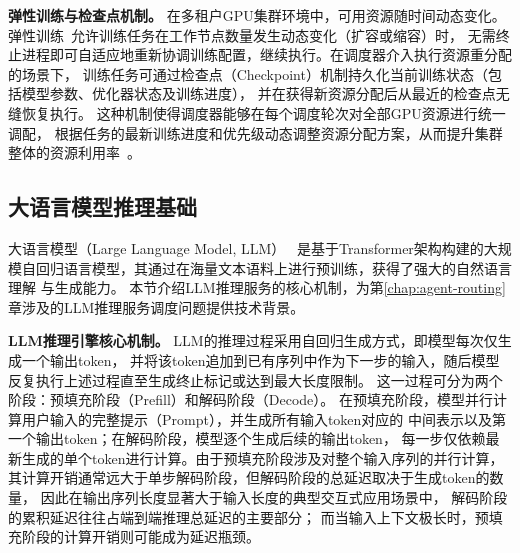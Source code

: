 \textbf{弹性训练与检查点机制。}
在多租户GPU集群环境中，可用资源随时间动态变化。弹性训练~\cite{li2020pytorch}允许训练任务在工作节点数量发生动态变化（扩容或缩容）时，
无需终止进程即可自适应地重新协调训练配置，继续执行。在调度器介入执行资源重分配的场景下，
训练任务可通过检查点（Checkpoint）机制持久化当前训练状态（包括模型参数、优化器状态及训练进度），
并在获得新资源分配后从最近的检查点无缝恢复执行。
这种机制使得调度器能够在每个调度轮次对全部GPU资源进行统一调配，
根据任务的最新训练进度和优先级动态调整资源分配方案，从而提升集群整体的资源利用率~\cite{peng2018optimus,qiao2021pollux}。


\subsection{大语言模型推理基础}\label{subsec:llm-inference-basics}

大语言模型（Large Language Model, LLM）~\cite{brown2020language}
是基于Transformer架构构建的大规模自回归语言模型，其通过在海量文本语料上进行预训练，获得了强大的自然语言理解
与生成能力。
本节介绍LLM推理服务的核心机制，为第\ref{chap:agent-routing}章涉及的LLM推理服务调度问题提供技术背景。

\textbf{LLM推理引擎核心机制。}
LLM的推理过程采用自回归生成方式，即模型每次仅生成一个输出token，
并将该token追加到已有序列中作为下一步的输入，随后模型反复执行上述过程直至生成终止标记或达到最大长度限制。
这一过程可分为两个阶段：预填充阶段（Prefill）和解码阶段（Decode）。
在预填充阶段，模型并行计算用户输入的完整提示（Prompt），并生成所有输入token对应的
中间表示以及第一个输出token；在解码阶段，模型逐个生成后续的输出token，
每一步仅依赖最新生成的单个token进行计算。由于预填充阶段涉及对整个输入序列的并行计算，
其计算开销通常远大于单步解码阶段，但解码阶段的总延迟取决于生成token的数量，
因此在输出序列长度显著大于输入长度的典型交互式应用场景中，
解码阶段的累积延迟往往占端到端推理总延迟的主要部分；
而当输入上下文极长时，预填充阶段的计算开销则可能成为延迟瓶颈。

